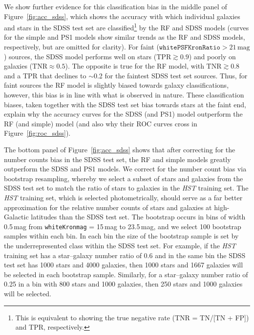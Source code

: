 \documentclass[twocolumn]{aastex62}
\begin{document}
We show further evidence for this classification bias in the middle panel of
Figure~\ref{fig:acc_sdss}, which shows the accuracy with which individual
galaxies and stars in the SDSS test set are classified\footnote{This is
equivalent to showing the true negative rate (TNR = TN/[TN + FP]) and TPR,
respectively.} by the RF and SDSS models (curves for the simple and PS1
models show similar trends as the RF and SDSS models, respectively, but are
omitted for clarity). For faint ($\mathtt{whitePSFKronRatio} >
21\,\mathrm{mag}$) sources, the SDSS model performs well on stars
($\mathrm{TPR} \gtrsim 0.9$) and poorly on galaxies ($\mathrm{TNR} \approx
0.5$). The opposite is true for the RF model, with $\mathrm{TNR} \gtrsim
0.8$ and a TPR that declines to $\sim$0.2 for the faintest SDSS test set
sources. Thus, for faint sources the RF model is slightly biased towards
galaxy classifications, however, this bias is in line with what is observed
in nature. These classification biases, taken together with the SDSS test
set bias towards stars at the faint end, explain why the accuracy curves for
the SDSS (and PS1) model outperform the RF (and simple) model (and also why
their ROC curves cross in Figure~\ref{fig:roc_sdss}).

The bottom panel of Figure~\ref{fig:acc_sdss} shows that after correcting
for the number counts bias in the SDSS test set, the RF and simple models
greatly outperform the SDSS and PS1 models. We correct for the number count
bias via bootstrap resampling, whereby we select a subset of stars and
galaxies from the SDSS test set to match the ratio of stars to galaxies in
the \textit{HST} training set. The \textit{HST} training set, which is
selected photometrically, should serve as a far better approximation for the
relative number counts of stars and galaxies at high-Galactic latitudes than
the SDSS test set. The bootstrap occurs in bins of width 0.5\,mag from
\texttt{whiteKronmag} = 15\,mag to 23.5\,mag, and we select 100 bootstrap
samples within each bin. In each bin the size of the bootstrap sample is set
by the underrepresented class within the SDSS test set. For example, if the
\textit{HST} training set has a star--galaxy number ratio of 0.6 and in the
same bin the SDSS test set has 1000 stars and 4000 galaxies, then 1000 stars
and 1667 galaxies will be selected in each bootstrap sample. Similarly, for
a star--galaxy number ratio of 0.25 in a bin with 800 stars and 1000
galaxies, then 250 stars and 1000 galaxies will be selected.
\end{document}
